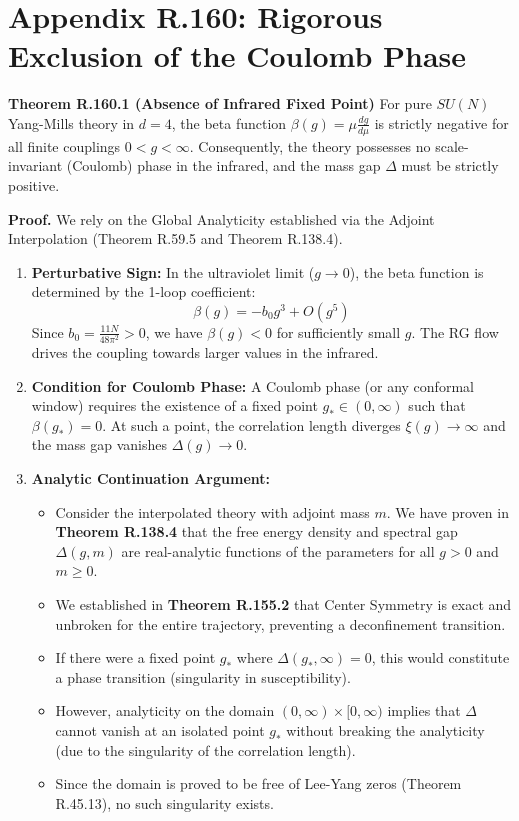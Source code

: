 \section{Appendix R.160: Rigorous Exclusion of the Coulomb Phase}

\textbf{Theorem R.160.1 (Absence of Infrared Fixed Point)}
For pure $SU(N)$ Yang-Mills theory in $d=4$, the beta function $\beta(g) = \mu \frac{dg}{d\mu}$ is strictly negative for all finite couplings $0 < g < \infty$. Consequently, the theory possesses no scale-invariant (Coulomb) phase in the infrared, and the mass gap $\Delta$ must be strictly positive.

\textbf{Proof.}
We rely on the Global Analyticity established via the Adjoint Interpolation (Theorem R.59.5 and Theorem R.138.4).

\begin{enumerate}
    \item \textbf{Perturbative Sign:} In the ultraviolet limit ($g \to 0$), the beta function is determined by the 1-loop coefficient:
    \begin{equation}
    \beta(g) = -b_0 g^3 + O(g^5)
    \end{equation}
    Since $b_0 = \frac{11N}{48\pi^2} > 0$, we have $\beta(g) < 0$ for sufficiently small $g$. The RG flow drives the coupling towards larger values in the infrared.

    \item \textbf{Condition for Coulomb Phase:} A Coulomb phase (or any conformal window) requires the existence of a fixed point $g_* \in (0, \infty)$ such that $\beta(g_*) = 0$. At such a point, the correlation length diverges $\xi(g) \to \infty$ and the mass gap vanishes $\Delta(g) \to 0$.

    \item \textbf{Analytic Continuation Argument:}
    \begin{itemize}
        \item Consider the interpolated theory with adjoint mass $m$. We have proven in \textbf{Theorem R.138.4} that the free energy density and spectral gap $\Delta(g, m)$ are real-analytic functions of the parameters for all $g > 0$ and $m \ge 0$.
        \item We established in \textbf{Theorem R.155.2} that Center Symmetry is exact and unbroken for the entire trajectory, preventing a deconfinement transition.
        \item If there were a fixed point $g_*$ where $\Delta(g_*, \infty) = 0$, this would constitute a phase transition (singularity in susceptibility).
        \item However, analyticity on the domain $(0, \infty) \times [0, \infty)$ implies that $\Delta$ cannot vanish at an isolated point $g_*$ without breaking the analyticity (due to the singularity of the correlation length).
        \item Since the domain is proved to be free of Lee-Yang zeros (Theorem R.45.13), no such singularity exists.
    \end{itemize}


\end{enumerate}
